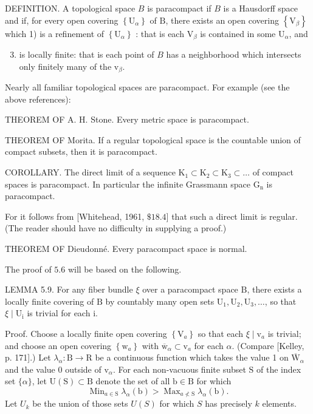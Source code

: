 \documentclass[10pt]{article}
\begin{document}
DEFINITION. A topological space $B$ is paracompact if $B$ is a Hausdorff space and if, for every open covering $\left\{\mathrm{U}_{\alpha}\right\}$ of $\mathrm{B}$, there exists an open covering $\left\{\mathrm{V}_{\beta}\right\}$ which 1) is a refinement of $\left\{\mathrm{U}_{\alpha}\right\}$ : that is each $\mathrm{V}_{\beta}$ is contained in some $\mathrm{U}_{\alpha}$, and

\begin{enumerate}
  \setcounter{enumi}{2}
  \item is locally finite: that is each point of $B$ has a neighborhood which intersects only finitely many of the $\mathrm{v}_{\beta}$.
\end{enumerate}
Nearly all familiar topological spaces are paracompact. For example (see the above references):

THEOREM OF A. H. Stone. Every metric space is paracompact.

THEOREM OF Morita. If a regular topological space is the countable union of compact subsets, then it is paracompact.

COROLLARY. The direct limit of a sequence $\mathrm{K}_{1} \subset \mathrm{K}_{2} \subset \mathrm{K}_{3} \subset \ldots$ of compact spaces is paracompact. In particular the infinite Grassmann space $\mathrm{G}_{\mathrm{n}}$ is paracompact.

For it follows from [Whitehead, 1961, $\$ 18.4]$ that such a direct limit is regular. (The reader should have no difficulty in supplying a proof.)

THEOREM OF Dieudonné. Every paracompact space is normal.

The proof of $5.6$ will be based on the following.

LEMMA 5.9. For any fiber bundle $\xi$ over a paracompact space $\mathrm{B}$, there exists a locally finite covering of $\mathrm{B}$ by countably many open sets $\mathrm{U}_{1}, \mathrm{U}_{2}, \mathrm{U}_{3}, \ldots$, so that $\xi \mid \mathrm{U}_{\mathrm{i}}$ is trivial for each i.

Proof. Choose a locally finite open covering $\left\{\mathrm{V}_{a}\right\}$ so that each $\xi \mid \mathrm{v}_{a}$ is trivial; and choose an open covering $\left\{\mathrm{w}_{a}\right\}$ with $\overline{\mathrm{w}}_{\alpha} \subset \mathrm{v}_{a}$ for each $\alpha$. (Compare [Kelley, p. 171].) Let $\lambda_{\alpha}: \mathrm{B} \rightarrow \mathrm{R}$ be a continuous function which takes the value 1 on $\overline{\mathrm{W}}_{\alpha}$ and the value 0 outside of $\mathrm{v}_{\alpha}$. For each non-vacuous finite subset $\mathrm{S}$ of the index set $\{\alpha\}$, let $\mathrm{U}(\mathrm{S}) \subset \mathrm{B}$ denote the set of all $\mathrm{b} \in \mathrm{B}$ for which
$$
\operatorname{Min}_{a \in \mathrm{S}} \lambda_{\alpha}(\mathrm{b})>\operatorname{Max}_{a \nless \mathrm{S}} \lambda_{\alpha}(\mathrm{b}) .
$$
Let $U_{k}$ be the union of those sets $U(S)$ for which $S$ has precisely $k$ elements.
\end{document}
